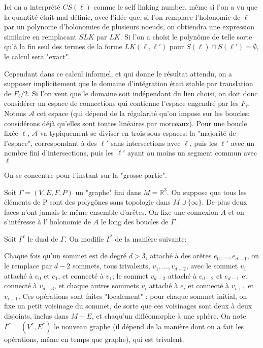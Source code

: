 \documentclass[10pt]{article}
\begin{document}
Ici on a interprété $CS(\ell)$ comme le self linking number, même si l'on a vu que la quantité était mal définie, avec l'idée que, si l'on remplace l'holonomie de $\ell$ par un polynome d'holonomies de plusieurs noeuds, on obtiendra une expression similaire en remplacant $SLK$ par $LK$. Si l'on a choisi le polynôme de telle sorte qu'à la fin seul des termes de la forme $LK(\ell, \ell')$ pour $S(\ell)\cap S(\ell')=\emptyset$, le calcul sera "exact".

Cependant dans ce calcul informel, et qui donne le résultat attendu, on a supposer implicitement que le domaine d'intégration était stable par translation de $F_\ell/2$. Si l'on veut que le domaine soit indépendant du lien choisi, on doit donc considérer un espace de connections qui contienne l'espace engendré par les $F_\ell$. Notons $\mathcal{A}$ cet espace (qui dépend de la régularité qu'on impose sur les boucles: considérons déjà qu'elles sont toutes linéaires par morceaux). Pour une boucle fixée $\ell$, $\mathcal{A}$ va typiquement se diviser en trois sous espaces: la "majorité de l'espace", correspondant à des $\ell'$ sans intersections avec $\ell$, puis les $\ell'$ avec un nombre fini d'intersections, puis les $\ell'$ ayant au moins un segment commun avec $\ell$ %

On se concentre pour l'instant sur la "grosse partie".

Soit $\Gamma=(V,E,F,P)$ un "graphe" fini dans $M=\mathbb{R}^3$. On suppose que tous les éléments de P sont des polygônes sans topologie dans $M\cup \{\infty\}$. De plus deux faces n'ont jamais le même ensemble d'arêtes.
On fixe une connexion $A$ et on s’intéresse à l’ holonomie de $A$ le long des boucles de $\Gamma$.

Soit $\Gamma^t$  le dual de $\Gamma$. On modifie $\Gamma^t$ de la manière suivante:

Chaque fois qu’un sommet est de degré $d>3$, attaché à des arêtes $e_0, … , e_{d-1}$, on le remplace par $d-2$ sommets, tous trivalents, $v_1, … , v_{d-2}$, avec le sommet $v_1$ attaché à $e_0$ et $e_1$, et connecté à $v_1$; le sommet $v_{d-2}$ attaché à $e_{d-2}$ et $e_{d-1}$ et connecté à $v_{d-3}$, et chaque autres sommets $v_i$ attaché à $e_i$ et connecté à $v_{i+1}$ et $v_{i-1}$. Ces opérations sont faites "localement" : pour chaque sommet initial, on fixe un petit voisinage du sommet, de sorte que ces voisinages sont deux à deux disjoints, inclus dans $M-E$, et chaqu’un difféomorphe à une sphère. On note $\Gamma^*=(V^*,E^*) $ le nouveau graphe (il dépend de la manière dont on a fait les opérations, même en temps que graphe), qui est trivalent.
\end{document}
